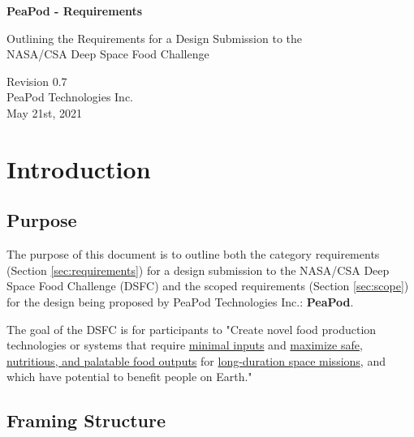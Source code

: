 \documentclass{report}
\begin{document}
\begin{titlepage}
    \begin{center}
        \vspace*{1.2cm}

        \textbf{\large{PeaPod - Requirements}}

        \vspace{0.5cm}

        Outlining the Requirements for a Design Submission to the \\NASA/CSA Deep Space Food Challenge

        \vfill
        
        \vspace{.75cm}

        Revision 0.7\\
        PeaPod Technologies Inc.\\
        May 21st, 2021

    \end{center}
\end{titlepage}

\thispagestyle{plain}

\tableofcontents
\newpage

\section{Introduction}
\label{sec:intro}

\subsection{Purpose}
\label{sec:purpose}

The purpose of this document is to outline both the category requirements (Section \ref{sec:requirements}) for a design submission to the NASA/CSA Deep Space Food Challenge (DSFC) \cite{dsfc} and the scoped requirements (Section \ref{sec:scope}) for the design being proposed by PeaPod Technologies Inc.: \textbf{PeaPod}.

The goal of the DSFC is for participants to "Create novel food production technologies or systems that require \uline{minimal inputs} and \uline{maximize safe, nutritious, and palatable food outputs} for \uline{long-duration space missions}, and which have potential to benefit people on Earth." \cite{applicantguide}

\subsection{Framing Structure}
\label{sec:structure}
\end{document}
